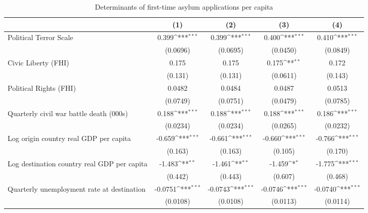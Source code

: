 \begin{table}[htbp]\centering
\def\sym#1{\ifmmode^{#1}\else\(^{#1}\)\fi}
\caption{Determinants of first-time asylum applications per capita}
\begin{tabular}{l*{4}{c}}
\hline\hline
                    &\multicolumn{1}{c}{(1)}         &\multicolumn{1}{c}{(2)}         &\multicolumn{1}{c}{(3)}         &\multicolumn{1}{c}{(4)}         \\
\hline
Political Terror Scale&       0.399\sym{***}&       0.399\sym{***}&       0.400\sym{***}&       0.410\sym{***}\\
                    &    (0.0696)         &    (0.0695)         &    (0.0450)         &    (0.0849)         \\
[1em]
Civic Liberty (FHI) &       0.175         &       0.175         &       0.175\sym{**} &       0.172         \\
                    &     (0.131)         &     (0.131)         &    (0.0611)         &     (0.143)         \\
[1em]
Political Rights (FHI)&      0.0482         &      0.0484         &      0.0487         &      0.0513         \\
                    &    (0.0749)         &    (0.0751)         &    (0.0479)         &    (0.0785)         \\
[1em]
Quarterly civil war battle death (000s)&       0.188\sym{***}&       0.188\sym{***}&       0.188\sym{***}&       0.186\sym{***}\\
                    &    (0.0234)         &    (0.0234)         &    (0.0265)         &    (0.0232)         \\
[1em]
Log origin country real GDP per capita&      -0.659\sym{***}&      -0.661\sym{***}&      -0.660\sym{***}&      -0.766\sym{***}\\
                    &     (0.163)         &     (0.163)         &     (0.105)         &     (0.170)         \\
[1em]
Log destination country real GDP per capita&      -1.483\sym{**} &      -1.461\sym{**} &      -1.459\sym{*}  &      -1.775\sym{***}\\
                    &     (0.442)         &     (0.443)         &     (0.607)         &     (0.468)         \\
[1em]
Quarterly unemployment rate at destination&     -0.0751\sym{***}&     -0.0743\sym{***}&     -0.0746\sym{***}&     -0.0740\sym{***}\\
                    &    (0.0108)         &    (0.0108)         &    (0.0113)         &    (0.0114)         \\

\end{tabular}
\end{table}

